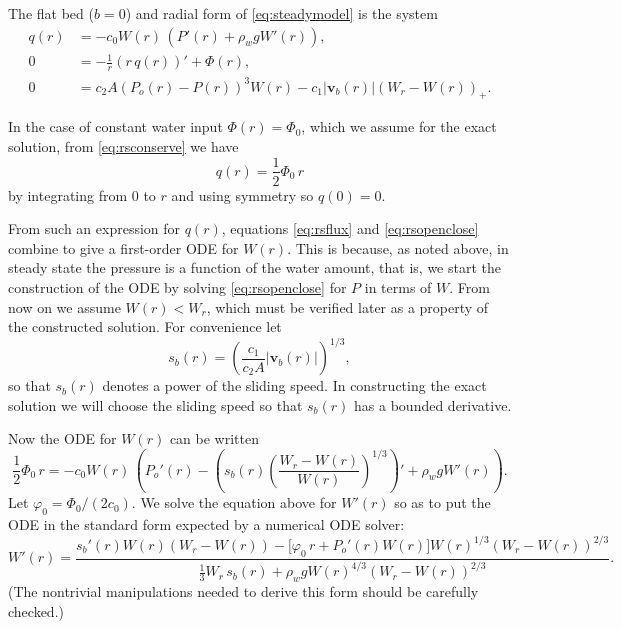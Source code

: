 \documentclass[11pt,final]{amsart}%
\newcommand\bv{\mathbf{v}}
\begin{document}
The flat bed ($b=0$) and radial form of \eqref{eq:steadymodel} is the system
\begin{align}
q(r) &= - c_0 W(r)\, \left(P'(r) + \rho_w g W'(r)\right), \label{eq:rsflux} \\
0 &= - \frac{1}{r}\left(r\,q(r)\right)' + \Phi(r), \label{eq:rsconserve} \\
0 &= c_2 A (P_o(r) - P(r))^3 W(r) - c_1 |\bv_b(r)| (W_r - W(r))_+. \label{eq:rsopenclose}
\end{align}

In the case of constant water input $\Phi(r)=\Phi_0$, which we assume for the exact solution, from \eqref{eq:rsconserve} we have
	$$q(r) = \frac{1}{2} \Phi_0\, r$$
by integrating from $0$ to $r$ and using symmetry so $q(0)=0$.    

From such an expression for $q(r)$, equations \eqref{eq:rsflux} and \eqref{eq:rsopenclose} combine to give a first-order ODE for $W(r)$.  This is because, as noted above, in steady state the pressure is a function of the water amount, that is, we start the construction of the ODE by solving \eqref{eq:rsopenclose} for $P$ in terms of $W$.  From now on we assume $W(r) < W_r$, which must be verified later as a property of the constructed solution.  For convenience let
    $$s_b(r) =  \left(\frac{c_1}{c_2 A} |\bv_b(r)|\right)^{1/3},$$
so that $s_b(r)$ denotes a power of the sliding speed.  In constructing the exact solution we will choose the sliding speed so that $s_b(r)$ has a bounded derivative.

Now the ODE for $W(r)$ can be written
	$$\frac{1}{2} \Phi_0\, r = - c_0 W(r)\, \left(P_o'(r) - \left(s_b(r) \left(\frac{W_r - W(r)}{W(r)}\right)^{1/3}\right)' + \rho_w g W'(r)\right).$$
Let $\varphi_0 = \Phi_0 / (2 c_0)$.  We solve the equation above for $W'(r)$ so as to put the ODE in the standard form expected by a numerical ODE solver:
\begin{equation}
W'(r) = \frac{s_b'(r) W(r) \left(W_r - W(r)\right) - \Big[\varphi_0\, r + P_o'(r) W(r)\Big] W(r)^{1/3} \left(W_r - W(r)\right)^{2/3}}{\frac{1}{3} W_r\, s_b(r) + \rho_w g W(r)^{4/3} \left(W_r - W(r)\right)^{2/3}}.
\label{eq:WradialODE}
\end{equation}
(The nontrivial manipulations needed to derive this form should be carefully checked.)
\end{document}
